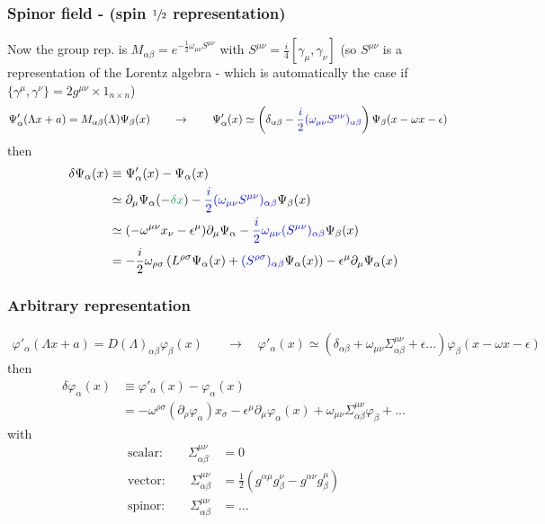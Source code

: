 \documentclass[10pt,a4paper]{report}
\theoremstyle{definition}
\begin{document}
\subsubsection{Spinor field - (spin $\sfrac{1}{2}$ representation)}
Now the group rep. is $M_{\alpha\beta}=e^{-\frac{1}{2}\omega_{\mu\nu}S^{\mu\nu}}$ with $S^{\mu\nu}=\frac{i}{4}[\gamma_\mu,\gamma_\nu]$ (so $S^{\mu\nu}$ is a representation of the Lorentz algebra - which is automatically the case if $\{\gamma^\mu,\gamma^\nu\}=2g^{\mu\nu}\times1_{n\times n}$)
\begin{align}
\Psi'_\alpha(\Lambda x+a)=M_{\alpha\beta}(\Lambda)\Psi_\beta(x)\qquad&\rightarrow\qquad\Psi'_\alpha(x)\simeq\left(\delta_{\alpha\beta}-\textcolor{blue}{\frac{i}{2}(\omega_{\mu\nu}S^{\mu\nu})_{\alpha\beta}}\right)\Psi_\beta(x-\omega x-\epsilon)
\end{align}
then
\begin{align}
\delta\Psi_\alpha(x)
&\equiv\Psi_\alpha'(x)-\Psi_\alpha(x)\\
&\simeq\partial_\mu\Psi_\alpha(-\textcolor{ForestGreen}{\delta x})-\textcolor{blue}{\frac{i}{2}(\omega_{\mu\nu}S^{\mu\nu})_{\alpha\beta}}\Psi_\beta(x)\\
&\simeq(-\omega^{\mu\nu}x_\nu-\epsilon^\mu)\partial_\mu\Psi_\alpha-\textcolor{blue}{\frac{i}{2}\omega_{\mu\nu}(S^{\mu\nu})_{\alpha\beta}}\Psi_\beta(x)\\
&=-\frac{i}{2}\omega_{\rho\sigma}\left(L^{\rho\sigma}\Psi_\alpha(x)+\textcolor{blue}{(S^{\rho\sigma})_{\alpha\beta}}\Psi_\alpha(x)\right)-\epsilon^\mu\partial_\mu\Psi_\alpha(x)
\end{align}



\subsubsection{Arbitrary representation}
\begin{align}
\varphi'_\alpha(\Lambda x+a)=D(\Lambda)_{\alpha\beta}\varphi_\beta(x)\quad&\rightarrow\quad \varphi'_\alpha(x)\simeq (\delta_{\alpha\beta}+\omega_{\mu\nu}\Sigma^{\mu\nu}_{\alpha\beta}+\epsilon...)\varphi_\beta(x-\omega x-\epsilon)
\end{align}
then
\begin{align}
\delta\varphi_\alpha(x)
&\equiv\varphi'_\alpha(x)-\varphi_\alpha(x)\\
&=-\omega^{\rho\sigma}(\partial_\rho\varphi_\alpha)x_\sigma-\epsilon^\mu\partial_\mu\varphi_\alpha(x)+\omega_{\mu\nu}\Sigma^{\mu\nu}_{\alpha\beta}\varphi_\beta+...
\end{align}
with
\begin{align}
\text{scalar:}\qquad\Sigma^{\mu\nu}_{\alpha\beta}&=0\\
\text{vector:}\qquad\Sigma^{\mu\nu}_{\alpha\beta}&=\frac{1}{2}(g^{\alpha\mu}g^\nu_\beta-g^{\alpha\nu}g^\mu_\beta)\\
\text{spinor:}\qquad\Sigma^{\mu\nu}_{\alpha\beta}&=...
\end{align}
\end{document}
